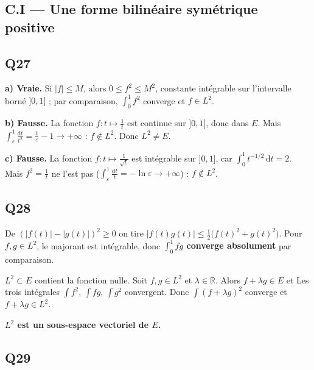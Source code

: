 \documentclass[11pt,a4paper]{article}
\newcommand{\equationajustee}[1]{%
  \sbox{\boiteequation}{$\displaystyle #1$}%
  \ifdim\wd\boiteequation>\linewidth
    \[\resizebox{\linewidth}{!}{\usebox{\boiteequation}}\]%
  \else
    \[#1\]%
  \fi}
\begin{document}
\hypertarget{c.i-une-forme-bilinuxe9aire-symuxe9trique-positive}{%
\subsection{C.I --- Une forme bilinéaire symétrique positive}\label{c.i-une-forme-bilinuxe9aire-symuxe9trique-positive}}

\hypertarget{q27}{%
\subsection{Q27}\label{q27}}

\textbf{a) Vraie.} Si \(|f|\leqslant M\), alors \(0\leqslant f^2\leqslant M^2\), constante intégrable sur l'intervalle borné \(]0,1]\) ; par comparaison, \(\int_0^1f^2\) converge et \(f\in L^2\).

\textbf{b) Fausse.} La fonction \(f:t\mapsto\frac1t\) est continue sur \(]0,1]\), donc dans \(E\). Mais \(\int_\varepsilon^1\frac{\mathrm dt}{t^2}=\frac1\varepsilon-1\to+\infty\) : \(f\notin L^2\). Donc \(L^2\neq E\).

\textbf{c) Fausse.} La fonction \(f:t\mapsto\frac1{\sqrt t}\) est intégrable sur \(]0,1]\), car \(\int_0^1t^{-1/2}\,\mathrm dt=2\). Mais \(f^2=\frac1t\) ne l'est pas (\(\int_\varepsilon^1\frac{\mathrm dt}t=-\ln\varepsilon\to+\infty\)) : \(f\notin L^2\).

\hypertarget{q28}{%
\subsection{Q28}\label{q28}}

De \((|f(t)|-|g(t)|)^2\geqslant0\) on tire \(|f(t)g(t)|\leqslant\frac12\bigl(f(t)^2+g(t)^2\bigr)\). Pour \(f,g\in L^2\), le majorant est intégrable, donc \textbf{\(\int_0^1fg\) converge absolument} par comparaison.

\(L^2\subset E\) contient la fonction nulle. Soit \(f,g\in L^2\) et \(\lambda\in\mathbb R\). Alors \(f+\lambda g\in E\) et
\equationajustee{(f+\lambda g)^2=f^2+2\lambda fg+\lambda^2g^2.}
Les trois intégrales \(\int f^2\), \(\int fg\), \(\int g^2\) convergent. Donc \(\int(f+\lambda g)^2\) converge et \(f+\lambda g\in L^2\).

\textbf{\(L^2\) est un sous-espace vectoriel de \(E\).}

\hypertarget{q29}{%
\subsection{Q29}\label{q29}}
\end{document}
